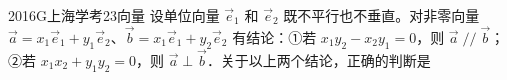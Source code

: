 
\begin{problem}{2016}{G}{上海学考}{23}{向量}
设单位向量 $ \vec{e}_1 $ 和 $ \vec{e}_2 $ 既不平行也不垂直。对非零向量 $ \vec{a}=x_1\vec{e}_1+y_1\vec{e}_2 $、$ \vec{b}=x_1\vec{e}_1+y_2\vec{e}_2 $ 有结论：①若 $ x_1y_2-x_2y_1=0 $，则 $ \vec{a}\mathop{//}\vec{b} $；②若 $ x_1x_2+y_1y_2=0 $，则 $ \vec{a}\perp\vec{b} $．关于以上两个结论，正确的判断是

\begin{choices}
\end{choices}
\end{problem}

\begin{answer}

\end{answer}

\begin{solutions}

\end{solutions}